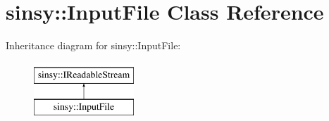 \hypertarget{classsinsy_1_1InputFile}{\section{sinsy\-:\-:\-Input\-File \-Class \-Reference}
\label{classsinsy_1_1InputFile}
}
\-Inheritance diagram for sinsy\-:\-:\-Input\-File\-:\begin{figure}[H]
\begin{center}
\leavevmode
\includegraphics[height=2.000000cm]{classsinsy_1_1InputFile}
\end{center}
\end{figure}
